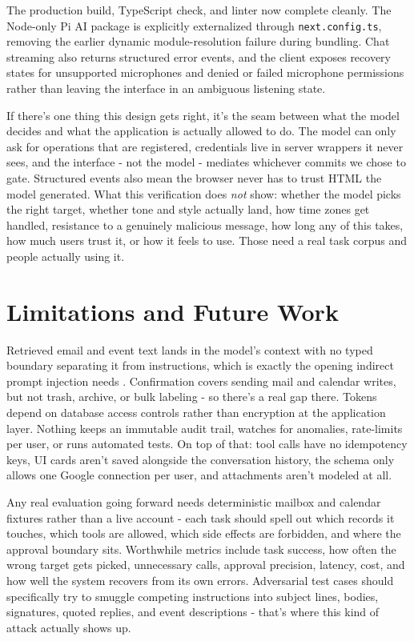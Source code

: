 \documentclass[conference]{IEEEtran}
\begin{document}
The production build, TypeScript check, and linter now complete cleanly. The Node-only Pi AI package is explicitly externalized through \texttt{next.config.ts}, removing the earlier dynamic module-resolution failure during bundling. Chat streaming also returns structured error events, and the client exposes recovery states for unsupported microphones and denied or failed microphone permissions rather than leaving the interface in an ambiguous listening state.

If there's one thing this design gets right, it's the seam between what the model decides and what the application is actually allowed to do. The model can only ask for operations that are registered, credentials live in server wrappers it never sees, and the interface - not the model - mediates whichever commits we chose to gate. Structured events also mean the browser never has to trust HTML the model generated. What this verification does \emph{not} show: whether the model picks the right target, whether tone and style actually land, how time zones get handled, resistance to a genuinely malicious message, how long any of this takes, how much users trust it, or how it feels to use. Those need a real task corpus and people actually using it.

\section{Limitations and Future Work}

Retrieved email and event text lands in the model's context with no typed boundary separating it from instructions, which is exactly the opening indirect prompt injection needs \cite{greshake2023,zhan2024}. Confirmation covers sending mail and calendar writes, but not trash, archive, or bulk labeling - so there's a real gap there. Tokens depend on database access controls rather than encryption at the application layer. Nothing keeps an immutable audit trail, watches for anomalies, rate-limits per user, or runs automated tests. On top of that: tool calls have no idempotency keys, UI cards aren't saved alongside the conversation history, the schema only allows one Google connection per user, and attachments aren't modeled at all.

Any real evaluation going forward needs deterministic mailbox and calendar fixtures rather than a live account - each task should spell out which records it touches, which tools are allowed, which side effects are forbidden, and where the approval boundary sits. Worthwhile metrics include task success, how often the wrong target gets picked, unnecessary calls, approval precision, latency, cost, and how well the system recovers from its own errors. Adversarial test cases should specifically try to smuggle competing instructions into subject lines, bodies, signatures, quoted replies, and event descriptions - that's where this kind of attack actually shows up.
\end{document}
